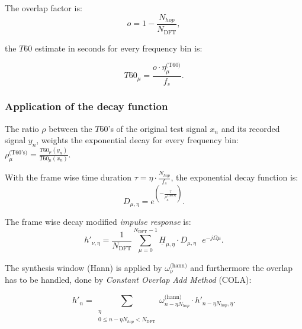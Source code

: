 \documentclass{article}
\begin{document}
The overlap factor is:
\begin{equation}
o = 1- \frac{N_{hop}}{N_{\text{DFT}}},
\end{equation}

the $T60$ estimate in seconds for every frequency bin is:

\begin{equation}
T60_{\mu} = \frac{o \cdot \eta^{\text{(T60)}}_{\mu} }{f_s}. \label{eq:T60mu}
\end{equation}


\subsubsection{Application of the decay function}
The ratio $\rho$ between the $T60$'s of the original test signal $x_n$ and its recorded signal $y_n$, weights the exponential decay for every frequency bin: $\rho^{\text{(T60's)}}_{\mu} =\frac{T60_{\mu}(y_n)}{T60_{ \mu}(x_n)}$.

With the frame wise time duration $ \tau = \eta \cdot \frac{N_{hop}}{f_s} $, the exponential decay function is:
\begin{equation}
D_{\mu, \eta} = e^{\left(-\frac{\tau}{\rho^{\text{(T60's)}}_{\mu}}\right)}.
\end{equation}

The frame wise decay modified \textit{impulse response} is:
\begin{equation}
h'_{ \nu , \eta} = \frac{1}{N_{\text{DFT}}} \sum_{\mu=0}^{N_{\text{DFT}}-1}  \underline{H}_{\mu, \eta} \cdot D_{\mu, \eta} \text{ } e^{-j\Omega \mu}.
\end{equation}
 
The synthesis window (Hann) is applied by $\omega^{\text{(hann)}}_\nu$ \cite{smith2011spectral} and furthermore the overlap has to be handled, done by \textit{Constant Overlap Add Method} (COLA):

\begin{equation}
h'_n = \sum_{\substack{\eta \\ 0 \leq n - \eta N_{hop} < N_{\text{DFT}}}}{\omega^{\text{(hann)}}_{n - \eta N_{hop}} \cdot h'_{n - \eta N_{hop}, \eta} }.
\end{equation}
\end{document}
